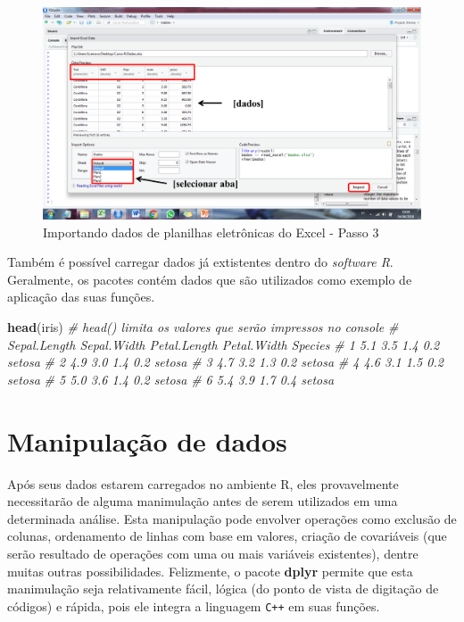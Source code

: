 \documentclass[
]{book}
\newenvironment{Shaded}{\begin{snugshade}}{\end{snugshade}}
\newcommand{\CommentTok}[1]{\textcolor[rgb]{0.56,0.35,0.01}{\textit{#1}}}
\newcommand{\KeywordTok}[1]{\textcolor[rgb]{0.13,0.29,0.53}{\textbf{#1}}}
\newcommand{\NormalTok}[1]{#1}
\numberwithin{equation}{section}
\newcommand{\indt}[1]{\index{#1|ST}}
\begin{document}
\begin{figure}
\centering
\includegraphics{figures/Import2.png}
\caption{Importando dados de planilhas eletrônicas do Excel - Passo 3}
\end{figure}

Também é possível carregar dados já extistentes dentro do \emph{software R}. Geralmente, os pacotes contém dados que são utilizados como exemplo de aplicação das suas funções.

\begin{Shaded}
\begin{Highlighting}[]
\KeywordTok{head}\NormalTok{(iris) }\CommentTok{\# head() limita os valores que serão impressos no console}
\CommentTok{\#   Sepal.Length Sepal.Width Petal.Length Petal.Width Species}
\CommentTok{\# 1          5.1         3.5          1.4         0.2  setosa}
\CommentTok{\# 2          4.9         3.0          1.4         0.2  setosa}
\CommentTok{\# 3          4.7         3.2          1.3         0.2  setosa}
\CommentTok{\# 4          4.6         3.1          1.5         0.2  setosa}
\CommentTok{\# 5          5.0         3.6          1.4         0.2  setosa}
\CommentTok{\# 6          5.4         3.9          1.7         0.4  setosa}
\end{Highlighting}
\end{Shaded}

\hypertarget{manipula}{%
\chapter{Manipulação de dados}\label{manipula}}

Após seus dados estarem carregados no ambiente R, eles provavelmente necessitarão de alguma manimulação antes de serem utilizados em uma determinada análise. Esta manipulação pode envolver operações como exclusão de colunas, ordenamento de linhas com base em valores, criação de covariáveis (que serão resultado de operações com uma ou mais variáveis existentes), dentre muitas outras possibilidades. Felizmente, o pacote \textbf{dplyr} \indt{dplyr} permite que esta manimulação seja relativamente fácil, lógica (do ponto de vista de digitação de códigos) e rápida, pois ele integra a linguagem \texttt{C++} em suas funções.
\end{document}

